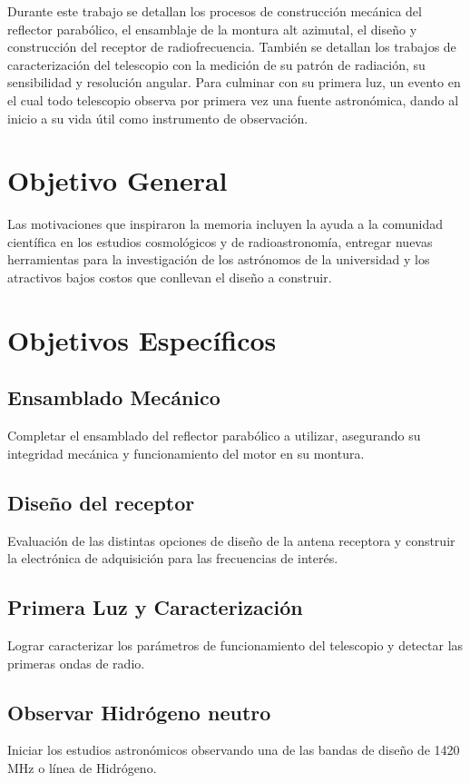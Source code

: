 Durante este trabajo se detallan los procesos de construcción mecánica del reflector parabólico, el ensamblaje de la montura alt azimutal, el diseño y construcción del receptor de radiofrecuencia. También se detallan los trabajos de caracterización del telescopio con la medición de su patrón de radiación, su sensibilidad y resolución angular. Para culminar con su primera luz, un evento en el cual todo telescopio observa por primera vez una fuente astronómica, dando al inicio a su vida útil como instrumento de observación.\\


\section{Objetivo General}
Las motivaciones que inspiraron la memoria incluyen la ayuda a la comunidad científica en los estudios cosmológicos y de radioastronomía, entregar nuevas herramientas para la investigación de los astrónomos de la universidad y los atractivos bajos costos que conllevan el diseño a construir.
\section{Objetivos Específicos}
\subsection{Ensamblado Mecánico}

Completar el ensamblado del reflector parabólico a utilizar, asegurando su integridad mecánica y funcionamiento del motor en su montura.

\subsection{Diseño del receptor}

Evaluación de las distintas opciones de diseño de la antena receptora y construir la electrónica de adquisición para las frecuencias de interés.

\subsection{Primera Luz y Caracterización}

Lograr caracterizar los parámetros de funcionamiento del telescopio y detectar las primeras ondas de radio.

\subsection{Observar Hidrógeno neutro}


Iniciar los estudios astronómicos observando una de las bandas de diseño de 1420 MHz o línea de Hidrógeno.